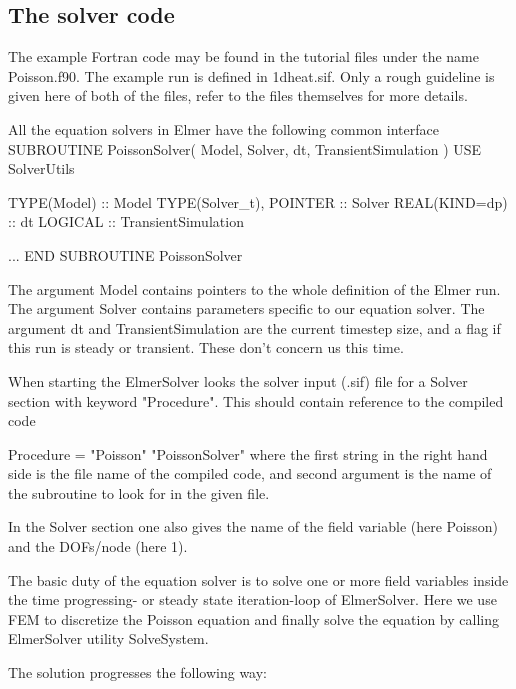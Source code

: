\subsection*{The solver code}

The example Fortran code may be found in the tutorial files under the
name Poisson.f90.  The example run is defined in 1dheat.sif.
Only a rough guideline is given here of both of the files, refer to the
files themselves for more details.

All the  equation solvers in Elmer have the following common interface
\ttbegin
SUBROUTINE PoissonSolver( Model, Solver, dt, TransientSimulation )
  USE SolverUtils

  TYPE(Model) :: Model
  TYPE(Solver_t), POINTER :: Solver
  REAL(KIND=dp) :: dt
  LOGICAL :: TransientSimulation

    ...
END SUBROUTINE PoissonSolver
\ttend

The argument Model contains pointers to the whole definition of the Elmer run.
The argument Solver contains parameters specific to our equation solver.
The argument dt and TransientSimulation are the current timestep size, and a
flag if this run is steady or transient. These don't concern us this time.

When starting the ElmerSolver looks the solver input (.sif) file for a
Solver section with keyword "Procedure". This should contain reference to
the compiled code

\ttbegin
   Procedure = "Poisson" "PoissonSolver"
\ttend
where the first string in the right hand side is the file name of the compiled
code, and second argument is the name of the subroutine to look for in the given file.

In the Solver section one also gives the name of the field variable
(here Poisson) and the DOFs/node (here 1).

The basic duty of the equation solver is to solve one or more field variables inside
the time progressing- or steady state iteration-loop of ElmerSolver.  Here we use
FEM to discretize the Poisson equation and finally solve the equation by calling
ElmerSolver utility SolveSystem.

The solution progresses the following way:

